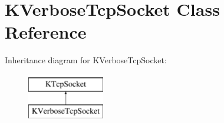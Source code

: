 \hypertarget{class_k_verbose_tcp_socket}{\section{\-K\-Verbose\-Tcp\-Socket \-Class \-Reference}
\label{class_k_verbose_tcp_socket}
}
\-Inheritance diagram for \-K\-Verbose\-Tcp\-Socket\-:\begin{figure}[H]
\begin{center}
\leavevmode
\includegraphics[height=2.000000cm]{class_k_verbose_tcp_socket}
\end{center}
\end{figure}
